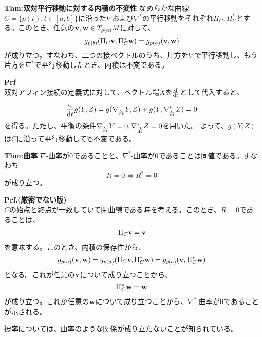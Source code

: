 \documentclass[a4paper,11pt]{jsarticle}
\numberwithin{equation}{section}
\begin{document}
\begin{itembox}[l]{\textbf{Thm:双対平行移動に対する内積の不変性}}
    なめらかな曲線$C = \{p(t) ; t \in [a,b]\}$に沿った$\nabla$および$\nabla^*$の平行移動をそれぞれ$\Pi_C,\Pi_C^*$とする。このとき、任意の$\vb{v},\vb{w} \in T_{p(a)}M$に対して、
    \begin{equation}
        g_{p(b)}(\Pi_C \vb{v},\Pi_C^* \vb{w}) = g_{p(a)}(\vb{v},\vb{w})
    \end{equation}
    が成り立つ。すなわち、二つの接ベクトルのうち、片方を$\nabla$で平行移動し、もう片方を$\nabla^*$で平行移動したとき、内積は不変である。
\end{itembox}
\textbf{Prf}\\
双対アフィン接続の定義式に対して、ベクトル場$X$を$\dv{t}$として代入すると、
\begin{align}
    \dv{t}g(Y,Z) =g(\nabla_{\dv{t}}Y,Z) + g(Y,\nabla^*_{\dv{t}}Z)=0
\end{align}
を得る。ただし、平衡の条件$\nabla_{\dv{t}}Y=0,\nabla^*_{\dv{t}}Z=0$を用いた。
よって、$g(Y,Z)$は$C$に沿って平行移動しても不変である。\hfill\qedsymbol

\begin{itembox}[l]{\textbf{Thm:曲率}}
    $\nabla$-曲率が0であることと、$\nabla^*$-曲率が0であることは同値である。すなわち
    \begin{equation}
        R = 0 \Leftrightarrow R^* = 0
    \end{equation}
    が成り立つ。
\end{itembox}
\textbf{Prf.(厳密でない版)}\\
$C$の始点と終点が一致していて閉曲線である時を考える。このとき、$R=0$であることは、
\begin{align}
    \Pi_C \vb{v} = \vb{v} 
\end{align}
を意味する。このとき、内積の保存性から、
\begin{align}
    g_{p(a)}(\vb{v},\vb{w}) = g_{p(a)}(\Pi_C \vb{v},\Pi_C^* \vb{w}) = g_{p(a)}(\vb{v},\Pi_C^* \vb{w})
\end{align}
となる。これが任意の$\vb{v}$について成り立つことから、
\begin{align}
    \Pi_C^* \vb{w} = \vb{w}
\end{align}
が成り立つ。これが任意の$\vb{w}$について成り立つことから、$\nabla^*$-曲率が0であることが示される。\hfill\qedsymbol

捩率については、曲率のような関係が成り立たないことが知られている。
\end{document}
